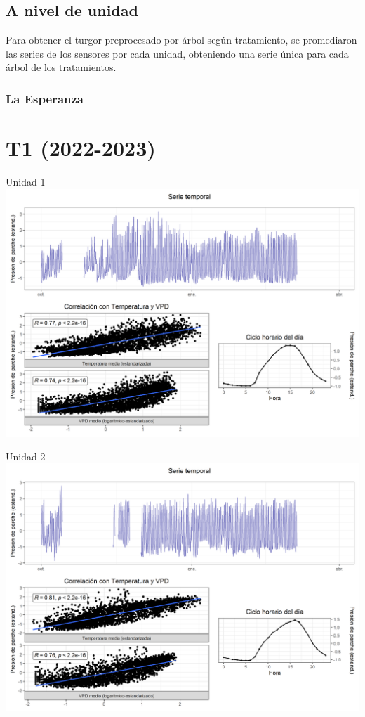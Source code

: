 \documentclass[
  letterpaper,
  DIV=11,
  numbers=noendperiod]{scrreprt}
\begin{document}
\section{A nivel de unidad}\label{a-nivel-de-unidad}

Para obtener el turgor preprocesado por árbol según tratamiento, se
promediaron las series de los sensores por cada unidad, obteniendo una
serie única para cada árbol de los tratamientos.

\subsection{La Esperanza}\label{la-esperanza-4}

\chapter{T1 (2022-2023)}

Unidad 1
\includegraphics{figuras/04_turgor_unidad/2022_2023_La_Esperanza_T1_Unidad_1.png}

Unidad 2
\includegraphics{figuras/04_turgor_unidad/2022_2023_La_Esperanza_T1_Unidad_2.png}
\end{document}
